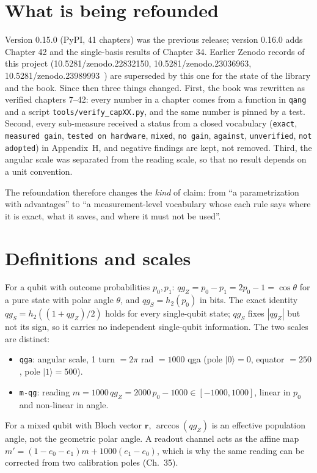 \documentclass[11pt]{article}
\newcommand{\qgZ}{qg_Z}
\newcommand{\qgS}{qg_S}
\newcommand{\st}[1]{\texttt{#1}}
\begin{document}
\section{What is being refounded}
Version 0.15.0 (PyPI, 41 chapters) was the previous release; version 0.16.0 adds Chapter 42 and the single-basis results of Chapter 34. Earlier Zenodo records of this project (10.5281/zenodo.22832150, 10.5281/zenodo.23036963, 10.5281/zenodo.23989993~\cite{z1,z2,z3}) are superseded by this one for the state of the library and the book. Since then three things changed. First, the book was rewritten as verified chapters 7--42: every number in a chapter comes from a function in \texttt{qang} and a script \texttt{tools/verify\_capXX.py}, and the same number is pinned by a test. Second, every sub-measure received a status from a closed vocabulary (\st{exact}, \st{measured gain}, \st{tested on hardware}, \st{mixed}, \st{no gain}, \st{against}, \st{unverified}, \st{not adopted}) in Appendix~H, and negative findings are kept, not removed. Third, the angular scale was separated from the reading scale, so that no result depends on a unit convention.

The refoundation therefore changes the \emph{kind} of claim: from ``a parametrization with advantages'' to ``a measurement-level vocabulary whose each rule says where it is exact, what it saves, and where it must not be used''.

\section{Definitions and scales}
For a qubit with outcome probabilities $p_0,p_1$: $\qgZ=p_0-p_1=2p_0-1=\cos\theta$ for a pure state with polar angle $\theta$, and $\qgS=h_2(p_0)$ in bits. The exact identity $\qgS=h_2((1+\qgZ)/2)$ holds for every single-qubit state; $\qgS$ fixes $|\qgZ|$ but not its sign, so it carries no independent single-qubit information. The two scales are distinct:
\begin{itemize}
\item \st{qga}: angular scale, 1 turn $=2\pi$ rad $=1000$ qga (pole $|0\rangle=0$, equator $=250$, pole $|1\rangle=500$).
\item \st{m-qg}: reading $m=1000\,\qgZ=2000\,p_0-1000\in[-1000,1000]$, linear in $p_0$ and non-linear in angle.
\end{itemize}
For a mixed qubit with Bloch vector $\mathbf r$, $\arccos(\qgZ)$ is an effective population angle, not the geometric polar angle. A readout channel acts as the affine map $m'=(1-e_0-e_1)m+1000(e_1-e_0)$, which is why the same reading can be corrected from two calibration poles (Ch.~35).
\end{document}
